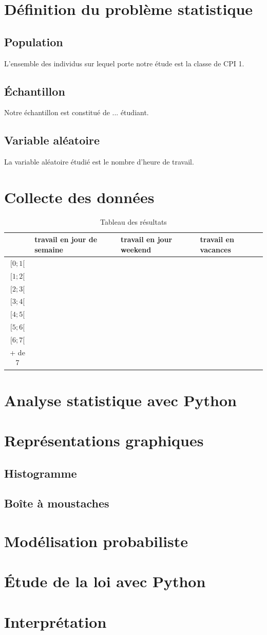 \documentclass[rapport]{subfiles}
\begin{document}
	\section{Définition du problème statistique}
	\subsection{Population}
	L’ensemble des individus sur lequel porte notre étude est la classe de CPI 1.
	\subsection{Échantillon}
	Notre échantillon est constitué de ... étudiant.
	\subsection{Variable aléatoire}
	La variable aléatoire étudié est le nombre d'heure de travail.
	\section{Collecte des données}
	\begin{table}[H]
		\centering
		\caption{Tableau des résultats}
		\label{tab:1}
		\begin{tabular}{|c|p{3cm}|p{3cm}|p{3cm}|}
			\hline
			& travail en jour de semaine  & travail en jour weekend & travail en vacances \\
			\hline
			$[0;1[$ &  &  &  \\
			\hline
			$[1;2[$ &  &  &  \\
			\hline
			$[2;3[$ &  &  &  \\
			\hline
			$[3;4[$ &  &  &  \\
			\hline
			$[4;5[$ &  &  &  \\
			\hline
			$[5;6[$ &  &  &  \\
			\hline
			$[6;7[$ &  &  &  \\
			\hline
			+ de 7 &  &  &  \\
			\hline
		\end{tabular}
	\end{table}

	\section{Analyse statistique avec Python}
	\section{Représentations graphiques}
	\subsection{Histogramme}
	\subsection{Boîte à moustaches}
	\section{Modélisation probabiliste}
	\section{Étude de la loi avec Python}
	\section{Interprétation}
\end{document}
